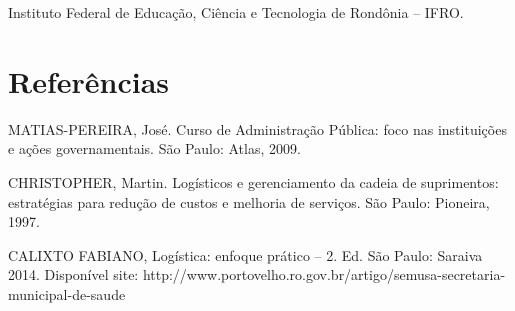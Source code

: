 \documentclass[article,12pt,onesidea,4paper,english,brazil]{abntex2}
\begin{document}
Instituto Federal de Educação, Ciência e Tecnologia de Rondônia – IFRO.

\sloppy

\section*{Referências}

\noindent MATIAS-PEREIRA, José. Curso de Administração Pública: foco nas instituições e ações governamentais. São Paulo: Atlas, 2009.

\noindent CHRISTOPHER, Martin. Logísticos e gerenciamento da cadeia de suprimentos: estratégias para redução de custos e melhoria de serviços. São Paulo: Pioneira, 1997.

\noindent CALIXTO FABIANO, Logística: enfoque prático – 2. Ed. São Paulo: Saraiva 2014. Disponível site: http://www.portovelho.ro.gov.br/artigo/semusa-secretaria-municipal-de-saude
\end{document}
